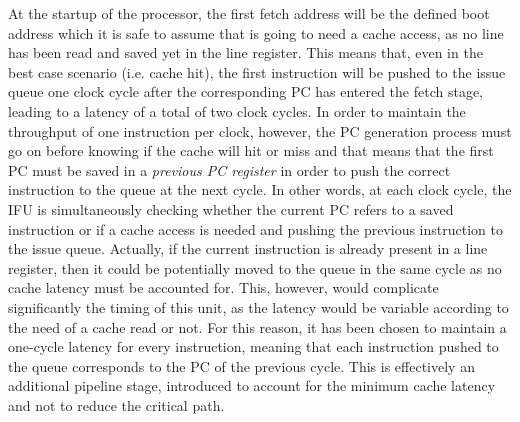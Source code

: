 At the startup of the processor, the first fetch address will be the defined boot address which it is safe to assume that is going to need a cache access, as no line has been read and saved yet in the line register. This means that, even in the best case scenario (i.e. cache hit), the first instruction will be pushed to the issue queue one clock cycle after the corresponding \ac{PC} has entered the fetch stage, leading to a latency of a total of two clock cycles. In order to maintain the throughput of one instruction per clock, however, the \ac{PC} generation process must go on before knowing if the cache will hit or miss and that means that the first \ac{PC} must be saved in a \emph{previous \ac{PC} register} in order to push the correct instruction to the queue at the next cycle. In other words, at each clock cycle, the \ac{IFU} is simultaneously checking whether the current \ac{PC} refers to a saved instruction or if a cache access is needed and pushing the previous instruction to the issue queue. Actually, if the current instruction is already present in a line register, then it could be potentially moved to the queue in the same cycle as no cache latency must be accounted for. This, however, would complicate significantly the timing of this unit, as the latency would be variable according to the need of a cache read or not. For this reason, it has been chosen to maintain a one-cycle latency for every instruction, meaning that each instruction pushed to the queue corresponds to the \ac{PC} of the previous cycle. This is effectively an additional pipeline stage, introduced to account for the minimum cache latency and not to reduce the critical path.

